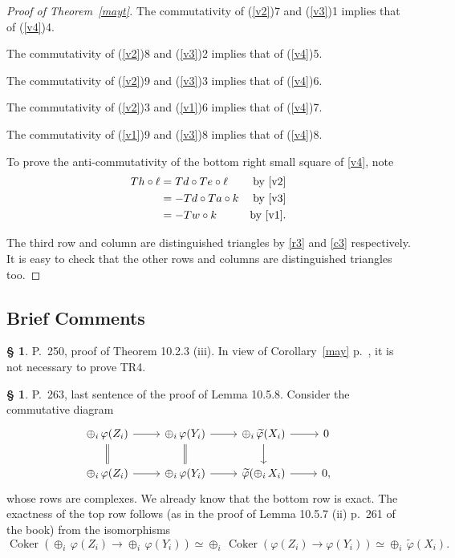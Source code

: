 \documentclass[12pt]{article}
\theoremstyle{remark}
\theoremstyle{definition}
\newtheorem{s}[thm]{\S}
\newcommand{\pp}{\varphi}
\DeclareMathOperator{\Coker}{Coker}
\begin{document}
\begin{proof}[Proof of Theorem~\ref{mayt}]
The commutativity of (\ref{v2})7 and (\ref{v3})1 implies that of (\ref{v4})4.

The commutativity of (\ref{v2})8 and (\ref{v3})2 implies that of (\ref{v4})5. 

The commutativity of (\ref{v2})9 and (\ref{v3})3 implies that of (\ref{v4})6. 

The commutativity of (\ref{v2})3 and (\ref{v1})6 implies that of (\ref{v4})7. 

The commutativity of (\ref{v1})9 and (\ref{v3})8 implies that of (\ref{v4})8. 

To prove the anti-commutativity of the bottom right small square of \eqref{v4}, note 
%
\begin{align*}
Th\circ\ell&=Td\circ Te\circ\ell&\text{by \eqref{v2}}\\ 
&=-Td\circ Ta\circ k&\text{by \eqref{v3}}\\  
&=-Tw\circ k&\text{by \eqref{v1}}.
\end{align*} 

The third row and column are distinguished triangles by \eqref{r3} and \eqref{c3} respectively. It is easy to check that the other rows and columns are distinguished triangles too.
\end{proof}


\subsection{Brief Comments}

\begin{s} 
P.~250, proof of Theorem 10.2.3 (iii). In view of Corollary~\ref{may} p.~\pageref{may}, it is not necessary to prove TR4.
\end{s}

%

\begin{s} P.~263, last sentence of the proof of Lemma 10.5.8. Consider the commutative diagram  
$$
\begin{tikzcd}
\oplus_i\,\pp(Z_i)\ar[equal]{d}\ar{r}&\oplus_i\,\pp(Y_i)\ar[equal]{d}\ar{r}&\oplus_i\,\widetilde\pp(X_i)\ar{d}\ar{r}&0\\ 
\oplus_i\,\pp(Z_i)\ar{r}&\oplus_i\,\pp(Y_i)\ar{r}&\widetilde\pp(\oplus_i\,X_i)\ar{r}&0, 
\end{tikzcd}
$$ 
whose rows are complexes. We already know that the bottom row is exact. The exactness of the top row follows (as in the proof of Lemma 10.5.7 (ii) p.~261 of the book) from the isomorphisms 
$$
\Coker(\oplus_i\,\pp(Z_i)\to\oplus_i\,\pp(Y_i))\simeq\oplus_i\,\Coker(\pp(Z_i)\to\pp(Y_i))\simeq\oplus_i\,\widetilde\pp(X_i).
$$
\end{s}
\end{document}
